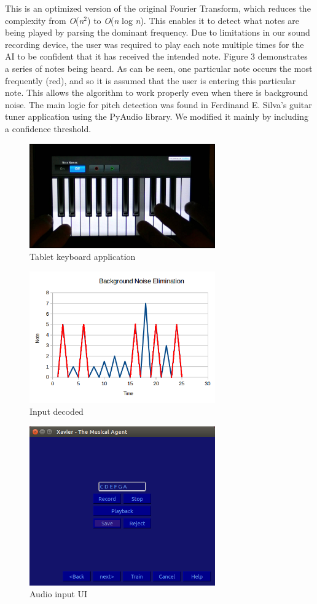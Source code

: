 \documentclass{chi2009}
\begin{document}
This is an optimized version of the original Fourier Transform, which reduces the complexity from \textit{O}(\textit{n}$^2$) to \textit{O}(\textit{n} log \textit{n}).  This enables it to detect what notes are being played by parsing the dominant frequency.  Due to limitations in our sound recording device, the user was required to play each note multiple times for the AI to be confident that it has received the intended note.  Figure 3 demonstrates a series of notes being heard.  As can be seen, one particular note occurs the most frequently (red), and so it is assumed that the user is entering this particular note.  This allows the algorithm to work properly even when there is background noise.  The main logic for pitch detection was found in Ferdinand E. Silva's guitar tuner application using the PyAudio library.  We modified it mainly by including a confidence threshold.

\begin{figure}[htp]
\centering
\includegraphics[width=8cm]{piano_app}
\caption{Tablet keyboard application}
\label{fig:piano_app}
\end{figure}

\begin{figure}[htp]
\centering
\includegraphics[width=8cm]{note_detection}
\caption{Input decoded}
\label{fig:frequencies}
\end{figure}

\begin{figure}[htp]
\centering
\includegraphics[width=8cm]{input_ui}
\caption{Audio input UI}
\label{fig:input_ui}
\end{figure}
\end{document}
